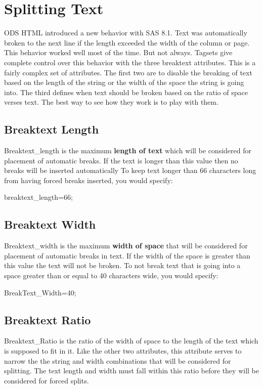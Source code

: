 \section{Splitting Text}
ODS HTML introduced a new behavior with SAS 8.1.  Text was automatically broken to
the next line if the length exceeded the width of the column or page.  This behavior
worked well most of the time.  But not always.  Tagsets give complete control over
this behavior with the three breaktext attributes.  This is a fairly complex set of
attributes.  The first two are to disable the breaking of text based on the length
of the string or the width of the space the string is going into.  The third defines
when text should be broken based on the ratio of space verses text.
The best way to see how they work is to play with them.

\subsection{Breaktext Length}
Breaktext\_length is the maximum {\bfseries length of text} which will be considered for placement 
of automatic breaks.  If the text is longer than this value then no breaks will be inserted
automatically
To keep text longer than 66 characters long from having forced breaks inserted, you would specify:
\begin{sfvcode}
  breaktext\_length=66;
\end{sfvcode}

\subsection{Breaktext Width}
Breaktext\_width is the maximum {\bfseries width of space} that will
be considered for placement of automatic breaks in text.  If the width
of the space is greater than this value the text will not be broken.
To not break text that is going into a space greater than or equal
to 40 characters wide, you would specify:

\begin{sfvcode}
    BreakText_Width=40;
\end{sfvcode}


\subsection{Breaktext Ratio}
Breaktext\_Ratio is the ratio of the width of space to the length of the text which is supposed to fit in it.  Like the other two attributes, this attribute serves to narrow the the string and
width combinations that will be considered for splitting.  The text length and width must fall
within this ratio before they will be considered for forced splits.

